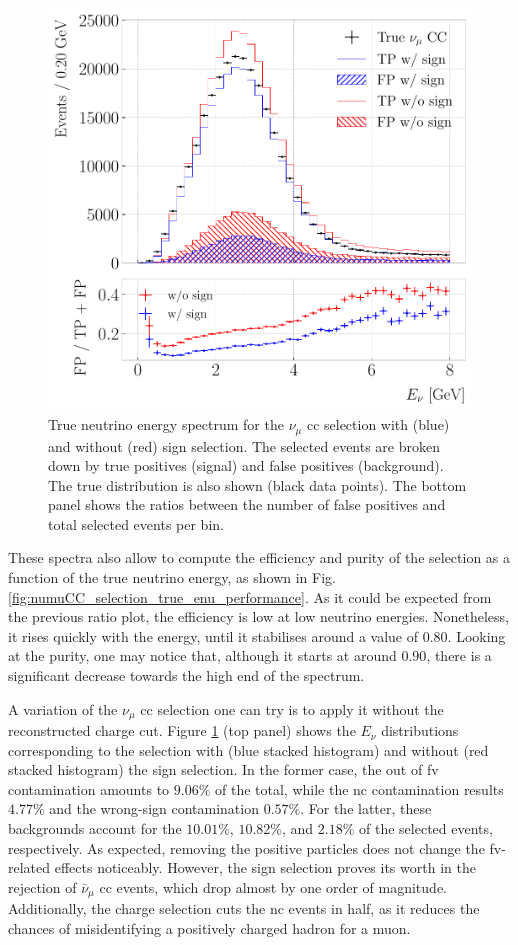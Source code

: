 \begin{figure}[t]
	\centering
	\includegraphics[width=.80\linewidth]{Images/GAr_selection/numuCC_selection_true_energy_sign_comp.pdf}
	\caption[True neutrino energy spectrum for the $\nu_{\mu}$ \gls{cc} selection with and without sign selection.]{True neutrino energy spectrum for the $\nu_{\mu}$ \gls{cc} selection with (blue) and without (red) sign selection. The selected events are broken down by true positives (signal) and false positives (background). The true distribution is also shown (black data points). The bottom panel shows the ratios between the number of false positives and total selected events per bin.}
	\label{fig:numuCC_sign_selection}
\end{figure}

These spectra also allow to compute the efficiency and purity of the selection as a function of the true neutrino energy, as shown in Fig. \ref{fig:numuCC_selection_true_enu_performance}. As it could be expected from the previous ratio plot, the efficiency is low at low neutrino energies. Nonetheless, it rises quickly with the energy, until it stabilises around a value of $0.80$. Looking at the purity, one may notice that, although it starts at around $0.90$, there is a significant decrease towards the high end of the spectrum.

A variation of the $\nu_{\mu}$ \gls{cc} selection one can try is to apply it without the reconstructed charge cut. Figure \ref{fig:numuCC_sign_selection} (top panel) shows the $E_{\nu}$ distributions corresponding to the selection with (blue stacked histogram) and without (red stacked histogram) the sign selection. In the former case, the out of \gls{fv} contamination amounts to $9.06\%$ of the total, while the \gls{nc} contamination results $4.77\%$ and the wrong-sign contamination $0.57\%$. For the latter, these backgrounds account for the $10.01\%$, $10.82\%$, and $2.18\%$ of the selected events, respectively. As expected, removing the positive particles does not change the \gls{fv}-related effects noticeably. However, the sign selection proves its worth in the rejection of $\bar{\nu}_{\mu}$ \gls{cc} events, which drop almost by one order of magnitude. Additionally, the charge selection cuts the \gls{nc} events in half, as it reduces the chances of misidentifying a positively charged hadron for a muon.

